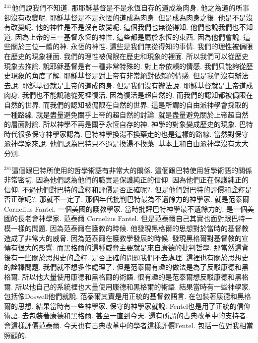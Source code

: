 \documentclass{book}
\begin{document}
$^{241}$他們說我們不知道.
那耶穌基督是不是永恆自存的道成為肉身.
他之為道的所事卻沒有改變呢.
耶穌基督是不是永恆的道成為肉身.
但是成為肉身之後.
他是不是沒有改變呢.
他的神性是不是沒有改變呢.
這個我們也無從得知.
他們也說我們也不知道.
因為上帝的三一基督永恆的神性.
這些都是屬於永恆的東西.
因為他們會說.
這些關於三位一體的神.
永恆的神性.
這些是我們無從得知的事情.
我們的理性被侷限在歷史的現象裡面.
我們的理性被侷限在歷史和現象的裡面.
所以我們可以從歷史現象去推論.
說耶穌基督是有一種非常特殊的.
對上帝依賴的情感.
我們只能夠從歷史現象的角度了解.
耶穌基督是對上帝有非常絕對依賴的情感.
但是我們沒有辦法去說.
耶穌基督就是上帝的道成肉身.
但是我們沒有辦法說.
耶穌基督就是上帝道成肉身.
我們也不能說祂從死裡復活.
因為復活是超自然的.
而我們的認知都被侷限在自然的世界.
而我們的認知被侷限在自然的世界.
這是所謂的自由派神學會採取的一種路線.
就是盡量避免關乎上帝的超自然的討論.
就是盡量避免關於上帝超自然的層面討論.
所以神學不再是關乎永恆自存的神.
神學的對象變成歷史的現象.
巴特時代很多保守神學家認為.
巴特神學換湯不換藥走的也是這樣的路線.
當然對保守派神學家來說.
他們認為巴特只不過是換湯不換藥.
基本上和自由派神學沒有太大分別.

$^{281}$這個跟巴特所使用的哲學術語有非常大的關係.
這個跟巴特使用哲學術語的關係非常密切.
因為他們認為他們的職責是保護純正的信仰.
因為他們正在保護純正的信仰.
不過他們對巴特的詮釋和評價是否正確呢?.
但是他們對巴特的評價和詮釋是否正確呢?.
那就不一定了.
那個年代批判巴特最為不遺餘力的神學家.
就是范泰爾 Cornelius Fantel.
一個美國的護教學家.
當時批評巴特神學最不遺餘力的.
是一個美國的長老會神學家.
范泰爾 Cornelius Fantel.
但是范泰爾自己其實也面對跟巴特一模一樣的問題.
因為范泰爾在護教的時候.
他發現黑格爾的思想對於當時的基督教造成了非常大的威脅.
因為范泰爾在護教學發展的時候.
發現黑格爾對基督教的宣傳有很大的影響.
而黑格爾的這種威脅主要就是來自康德的批判哲學.
那當然這背後有一些關於思想史的詮釋.
是否正確的問題我們不去處理.
這裡也有關於思想史的詮釋問題.
我們就不想多作處理了.
但是范泰爾有趣的做法是為了反駁康德和黑格爾.
所以他大量使用康德和黑格爾的術語.
很有趣的是范泰爾想反駁康德和黑格爾.
所以他自己的系統裡也大量使用康德和黑格爾的術語.
結果當時有一些神學家.
包括像Doswell他們就說.
范泰爾其實是用正統的基督教語言.
在包裝著康德和黑格爾的思想.
結果當時有一些神學家.
保守的神學家就說.
Fentel也是用了正統的信仰術語.
去包裝著康德和黑格爾.
甚至一直到今天.
還有所謂的古典改革中的支持者.
會這樣評價范泰爾.
今天也有古典改革中的學者這樣評價Fentel.
包括一位對我相當照顧的.
\end{document}
